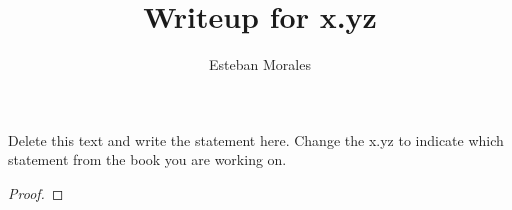 \documentclass[12pt]{article}
\newenvironment{statement}[2][Section]{\begin{trivlist}
\item[\hskip \labelsep {\bfseries #1}\hskip \labelsep {\bfseries #2.}]}{\end{trivlist}}
\begin{document}
 
%
%
 
\title{Writeup for x.yz} %
\author{Esteban Morales} %
\maketitle


\begin{statement}{x.yz} %
Delete this text and write the statement here. Change the x.yz to indicate which statement from the book you are working on.
\end{statement}
 
\begin{proof}  

\end{proof}
 








 
\end{document}
